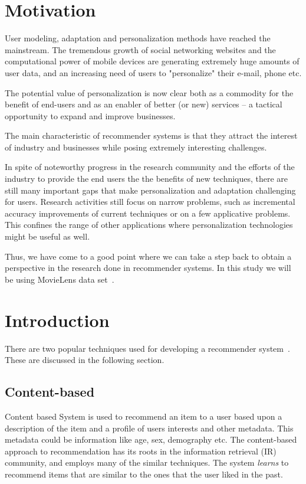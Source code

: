 \section{Motivation}

 User modeling, adaptation and personalization methods have reached the mainstream. The tremendous growth of social networking websites and the computational power of mobile devices are generating extremely huge amounts of user data, and an increasing need of users to "personalize" their e-mail, phone etc.

 The potential value of personalization is now clear both as a commodity for the benefit of end-users and as an enabler of better (or new) services – a tactical opportunity to expand and improve businesses.

 The main characteristic of recommender systems is that they attract the interest of industry and businesses while posing extremely interesting challenges.

 In spite of noteworthy progress in the research community and the efforts of the industry to provide the end users the the benefits of new techniques, there are still many important gaps that make personalization and adaptation challenging for users. Research activities still focus on narrow problems, such as incremental accuracy improvements of current techniques or on a few applicative problems. This confines the range of other applications where personalization technologies might be useful as well.

 Thus, we have come to a good point where we can take a step back to obtain a perspective in the research done in recommender systems. In this study we will be using MovieLens data set~\cite{movielens}.

\section{Introduction}
\label{sec:approaches}
There are two popular techniques used for developing a recommender system~\cite{nbrsurvey}. These are discussed in the following section.
\subsection{Content-based}
Content based System is used to recommend an item to a user based upon a description of the item and a profile of users interests and other metadata. This metadata could be information like age, sex, demography etc. The content-based approach to recommendation has its roots in the information retrieval (IR) community, and employs many of the similar techniques. The system \textit{learns} to recommend items that are similar to the ones that the user liked in the past. 
